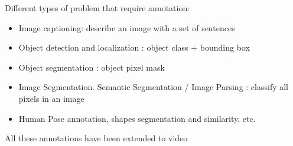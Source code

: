 Different types of problem that require annotation:
\begin{itemize}
	\item Image captioning: describe an image with a set of sentences
	\item Object detection and localization : object class + bounding box
	\item Object segmentation : object pixel mask
	\item Image Segmentation. Semantic Segmentation / Image Parsing : classify all pixels in an image
	\item Human Pose annotation, shapes segmentation and similarity, etc.
\end{itemize}
All these annotations have been extended to video \\ \\

%
%
%
%
%


